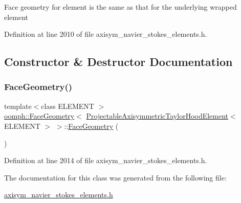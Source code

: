 Face geometry for element is the same as that for the underlying wrapped element 

Definition at line 2010 of file axisym\+\_\+navier\+\_\+stokes\+\_\+elements.\+h.



\subsection{Constructor \& Destructor Documentation}
\mbox{\label{classoomph_1_1FaceGeometry_3_01ProjectableAxisymmetricTaylorHoodElement_3_01ELEMENT_01_4_01_4_a88cce7e1385334f182617c0512e6caa2}} 
\subsubsection{\texorpdfstring{Face\+Geometry()}{FaceGeometry()}}
{\footnotesize\ttfamily template$<$class E\+L\+E\+M\+E\+NT $>$ \\
\hyperlink{classoomph_1_1FaceGeometry}{oomph\+::\+Face\+Geometry}$<$ \hyperlink{classoomph_1_1ProjectableAxisymmetricTaylorHoodElement}{Projectable\+Axisymmetric\+Taylor\+Hood\+Element}$<$ E\+L\+E\+M\+E\+NT $>$ $>$\+::\hyperlink{classoomph_1_1FaceGeometry}{Face\+Geometry} (\begin{DoxyParamCaption}{ }\end{DoxyParamCaption})\hspace{0.3cm}{\ttfamily [inline]}}



Definition at line 2014 of file axisym\+\_\+navier\+\_\+stokes\+\_\+elements.\+h.



The documentation for this class was generated from the following file\+:\begin{DoxyCompactItemize}
\item 
\hyperlink{axisym__navier__stokes__elements_8h}{axisym\+\_\+navier\+\_\+stokes\+\_\+elements.\+h}\end{DoxyCompactItemize}
